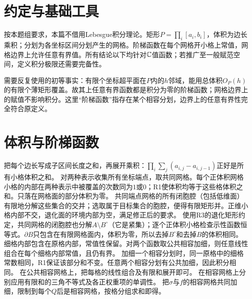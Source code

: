 \documentclass[UTF8,fontset=fandol,11pt]{ctexart}
\begin{document}
\section*{约定与基础工具}
按本题组要求，本篇不借用Lebesgue积分理论。矩形$P=\prod_i[a_i,b_i]$，体积为边长乘积；分划为各坐标区间分划产生的网格。阶梯函数在每个网格开小格上常值，网格边界上允许任意有界值。所有结论以下均针对$\mathbb C$值函数；若推广至一般赋范空间，定义积分极限还需要完备性。

需要反复使用的初等事实：有限个坐标超平面在$P$内的$h$邻域，能用总体积$O_P(h)$的有限个薄矩形覆盖。故其上任意有界函数都是积分为零的阶梯函数；网格边界上的赋值不影响积分。这里“阶梯函数”指存在某个相容分划，边界上的任意有界性完全符合原定义。
\section{体积与阶梯函数}
把每个边长写成子区间长度之和，再展开乘积：$\prod_i\sum_j(a_{i,j}-a_{i,j-1})$正好是所有小格体积之和。
对两种表示收集所有坐标端点，取共同网格。每个正体积网格小格的内部在两种表示中被覆盖的次数同为$1$或$0$；R1使体积均等于这些格体积之和。只落在网格面的部分体积为零。
共同端点网格的所有闭胞腔（包括低维面）有限地分解这些集合的交并；选取属于目标集合的胞腔，便得有限矩形并。正维小格内部不交，退化面的环境内部为空，满足修正后的要求。
使用R3的退化矩形约定，共同网格的闭胞腔也分解$A\setminus B^\circ$（它是紧集）；逐个正体积小格检查示性函数恒等式。$\partial B$只包含在有限网格面内，体积为零，所以去掉$B^\circ$和去掉$B$的体积相同。
细格内部包含在原格内部，常值性保留。对两个函数取公共相容加细，则任意线性组合在每个细格内部常值，且仍有界。
加细一个相容分划时，同一原格中的细格常数相同，R1保证该部分和不变。任意两个相容分划有公共加细，因此积分相同。
在公共相容网格上，把每格的线性组合及有限和展开即可。
在相容网格上分别应用有限和的三角不等式及各正权重项的单调性。
把$\sigma$与$f$的相容网格共同加细，限制到每个$Q$后是相容网格，按格分组求和即得。
\end{document}
